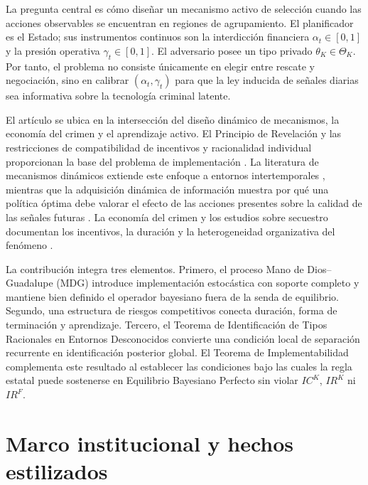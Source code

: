 \documentclass[12pt]{article}
\providecommand{\textcite}{\citet}
\theoremstyle{definition}
\theoremstyle{remark}
\newcommand{\1}{\mathbf{1}}
\begin{document}
La pregunta central es cómo diseñar un mecanismo activo de selección cuando las acciones observables se encuentran en regiones de agrupamiento. El planificador es el Estado; sus instrumentos continuos son la interdicción financiera $\alpha_t\in[0,1]$ y la presión operativa $\gamma_t\in[0,1]$. El adversario posee un tipo privado $\theta_K\in\Theta_K$. Por tanto, el problema no consiste únicamente en elegir entre rescate y negociación, sino en calibrar $(\alpha_t,\gamma_t)$ para que la ley inducida de señales diarias sea informativa sobre la tecnología criminal latente.

El artículo se ubica en la intersección del diseño dinámico de mecanismos, la economía del crimen y el aprendizaje activo. El Principio de Revelación y las restricciones de compatibilidad de incentivos y racionalidad individual proporcionan la base del problema de implementación \textcite{Gibbard1973,Myerson1979IC,Myerson1981,Rochet1987}. La literatura de mecanismos dinámicos extiende este enfoque a entornos intertemporales \textcite{CourtyLi2000,EsoSzentes2007,PavanSegalToikka2014}, mientras que la adquisición dinámica de información muestra por qué una política óptima debe valorar el efecto de las acciones presentes sobre la calidad de las señales futuras \textcite{Zhong2022}. La economía del crimen y los estudios sobre secuestro documentan los incentivos, la duración y la heterogeneidad organizativa del fenómeno \textcite{Becker1968,Ehrlich1973,Selten1977Kidnapping,Mejia2000Secuestro,Detotto2014Ransom,Forest2012Kidnapping,Shortland2019Kidnap}.

La contribución integra tres elementos. Primero, el proceso Mano de Dios--Guadalupe (MDG) introduce implementación estocástica con soporte completo y mantiene bien definido el operador bayesiano fuera de la senda de equilibrio. Segundo, una estructura de riesgos competitivos conecta duración, forma de terminación y aprendizaje. Tercero, el Teorema de Identificación de Tipos Racionales en Entornos Desconocidos convierte una condición local de separación recurrente en identificación posterior global. El Teorema de Implementabilidad complementa este resultado al establecer las condiciones bajo las cuales la regla estatal puede sostenerse en Equilibrio Bayesiano Perfecto sin violar $IC^K$, $IR^K$ ni $IR^F$.

\section{Marco institucional y hechos estilizados}
\label{sec:institutional}
\end{document}
